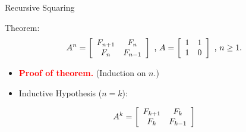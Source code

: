 \documentclass{beamer}
\begin{document}
\begin{frame}{Recursive Squaring}
    \begin{exampleblock}{Theorem:}
        $$
            A^n
            =
            \left[
                \begin{array}{c c}
                    F_{n + 1} & F_n \\
                    F_n       & F_{n - 1}
                \end{array}
            \right] \text{ , }
            A =
            \left[
                \begin{array}{c c}
                    1 & 1 \\
                    1 & 0
                \end{array}
            \right] \text{ , }
            n \geq 1\text{.}
        $$
    \end{exampleblock}
    \begin{itemize}
        \item[] \textbf{\textcolor{red}{Proof of theorem.}} (Induction on $n$.)
        \item[] Inductive Hypothesis ($n = k$):
    \end{itemize}
    \pause
    $$
        A^k
        =
        \left[
            \begin{array}{c c}
                F_{k + 1} & F_k \\
                F_k       & F_{k - 1}
            \end{array}
        \right]
    $$
\end{frame}
\end{document}
